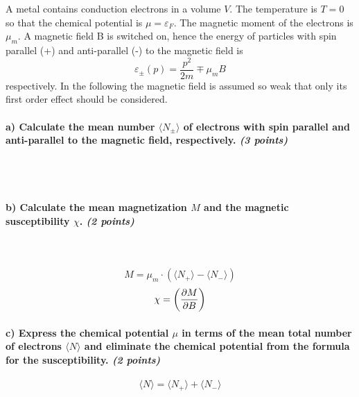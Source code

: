 A metal contains conduction electrons in a volume $V$. 
The temperature is $T=0$ so that the chemical potential is 
$\mu=\varepsilon_F$. The magnetic moment of the electrons 
is $\mu_m$. A magnetic field B is switched on, hence the 
energy of particles with spin parallel (+) and anti-parallel 
(-) to the magnetic field is
\begin{equation}
    \varepsilon_\pm(p)=\frac{p^2}{2m}\mp\mu_mB
\end{equation}
respectively. In the following the magnetic field is assumed 
so weak that only its first order effect should be considered.

\paragraph{a) Calculate the mean number $\langle N_\pm\rangle$ 
    of electrons with spin parallel and anti-parallel to the 
    magnetic field, respectively. \textit{(3 points)}
} \ \\
    \\


\paragraph{
    b) Calculate the mean magnetization $M$ and the magnetic 
    susceptibility $\chi$. \textit{(2 points)}
} \ \\
    \\
    \begin{equation}
        M=\mu_m\cdot(\langle N_+\rangle - \langle N_-\rangle)
    \end{equation}
    \begin{equation}
        \chi=\bigg(\frac{\partial M}{\partial B}\bigg)
    \end{equation}


\paragraph{
    c) Express the chemical potential $\mu$ in terms of the 
    mean total number of electrons $\langle N\rangle$ and 
    eliminate the chemical potential from the formula 
    for the susceptibility. \textit{(2 points)}
}
    \begin{equation}
        \langle N\rangle
        =\langle N_+\rangle+\langle N_-\rangle
    \end{equation}
